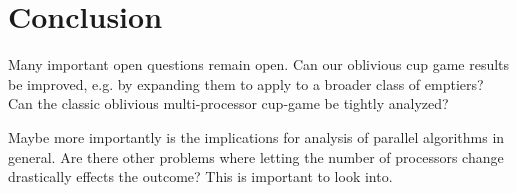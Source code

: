 \section{Conclusion}
Many important open questions remain open. Can our oblivious cup game results
be improved, e.g. by expanding them to apply to a broader class of emptiers?
Can the classic oblivious multi-processor cup-game be tightly analyzed?

Maybe more importantly is the implications for analysis of
parallel algorithms in general. Are there other problems where
letting the number of processors change drastically effects the
outcome? This is important to look into.

